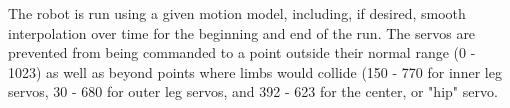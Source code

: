 The robot is run using a given motion model, including, if desired, 
smooth interpolation over time for the beginning and end of the run. 
The servos are prevented from being commanded to a point outside their
normal range (0 - 1023) as well as beyond points where limbs would collide
(150 - 770 for inner leg servos, 30 - 680 for outer leg servos, and 392 - 623
for the center, or "hip" servo.
